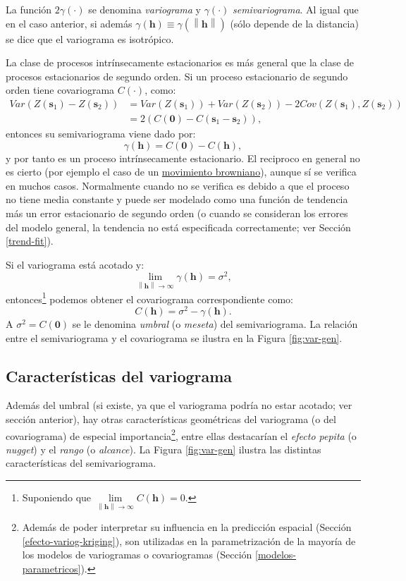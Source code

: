 \documentclass[
]{book}
\theoremstyle{break}
\theoremstyle{definition}
\theoremstyle{definition}
\theoremstyle{definition}
\theoremstyle{definition}
\theoremstyle{remark}
\begin{document}
La función \(2\gamma (\cdot)\) se denomina \emph{variograma} y \(\gamma (\cdot)\) \emph{semivariograma}.
Al igual que en el caso anterior, si además \(\gamma(\mathbf{h}) \equiv \gamma(\left\| \mathbf{h}\right\|)\) (sólo depende de la distancia) se dice que el variograma es isotrópico.

La clase de procesos intrínsecamente estacionarios es más general que la clase de procesos estacionarios de segundo orden.
Si un proceso estacionario de segundo orden tiene covariograma \(C(\cdot)\), como:
\[\begin{aligned}
Var(Z(\mathbf{s}_1)-Z(\mathbf{s}_2)) &= Var(Z(\mathbf{s}_1)) + Var(Z(\mathbf{s}_2))-2Cov(Z(\mathbf{s}_1),Z(\mathbf{s}_2)) \\
&=2\left(C(\mathbf{0})-C(\mathbf{s}_1 -\mathbf{s}_2)\right),
\end{aligned}\]
entonces su semivariograma viene dado por:
\[\gamma (\mathbf{h}) = C(\mathbf{0})-C(\mathbf{h}),\]
y por tanto es un proceso intrínsecamente estacionario.
El reciproco en general no es cierto (por ejemplo el caso de un \href{https://es.wikipedia.org/wiki/Movimiento_browniano\#Matem\%C3\%A1ticas}{movimiento browniano}), aunque sí se verifica en muchos casos.
Normalmente cuando no se verifica es debido a que el proceso no tiene media constante y puede ser modelado como una función de tendencia más un error estacionario de segundo orden (o cuando se consideran los errores del modelo general, la tendencia no está especificada correctamente; ver Sección \ref{trend-fit}).

Si el variograma está acotado y:
\[\lim \limits_{\left\| \mathbf{h}\right\| \rightarrow \infty }\gamma(\mathbf{h})=\sigma^2,\]
entonces\footnote{Suponiendo que \(\lim \limits_{\left\| \mathbf{h}\right\| \rightarrow \infty } C(\mathbf{h})=0\).} podemos obtener el covariograma correspondiente como:
\[C(\mathbf{h})=\sigma^2-\gamma (\mathbf{h}).\]
A \(\sigma^{2} = C(\mathbf{0})\) se le denomina \emph{umbral} (o \emph{meseta}) del semivariograma.
La relación entre el semivariograma y el covariograma se ilustra en la Figura \ref{fig:var-gen}.

\subsection{Características del variograma}\label{caracteristicas-variograma}

Además del umbral (si existe, ya que el variograma podría no estar acotado; ver sección anterior), hay otras características geométricas del variograma (o del covariograma) de especial importancia\footnote{Además de poder interpretar su influencia en la predicción espacial (Sección \ref{efecto-variog-kriging}), son utilizadas en la parametrización de la mayoría de los modelos de variogramas o covariogramas (Sección \ref{modelos-parametricos}).}, entre ellas destacarían el \emph{efecto pepita} (o \emph{nugget}) y el \emph{rango} (o \emph{alcance}).
La Figura \ref{fig:var-gen} ilustra las distintas características del semivariograma.
\end{document}
